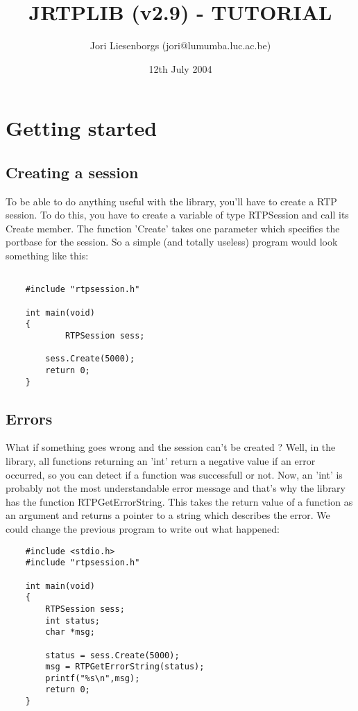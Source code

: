 


\author{Jori Liesenborgs (jori@lumumba.luc.ac.be)}
\title{JRTPLIB (v2.9) - TUTORIAL}
\date{12th July 2004}
\maketitle

\section{Getting started}

\subsection{Creating a session}

To be able to do anything useful with the library, you'll have to create a RTP
session. To do this, you have to create a variable of type RTPSession and call
its Create member. The function 'Create' takes one parameter which specifies
the portbase for the session. So a simple (and totally useless) program would
look something like this:
    \begin{verbatim}

    #include "rtpsession.h"
        
    int main(void)
    {
            RTPSession sess;
        
        sess.Create(5000);
        return 0;
    }
    \end{verbatim}

\subsection{Errors}

What if something goes wrong and the session can't be created ? Well, in the
library, all functions returning an 'int' return a negative value if an error
occurred, so you can detect if a function was successfull or not. Now, an
'int' is probably not the most understandable error message and that's why the
library has the function RTPGetErrorString. This takes the return value of a
function as an argument and returns a pointer to a string which describes the
error. We could change the previous program to write out what happened:
    \begin{verbatim}
    #include <stdio.h>
    #include "rtpsession.h"
        
    int main(void)
    {
        RTPSession sess;
        int status;
        char *msg;
            
        status = sess.Create(5000);
        msg = RTPGetErrorString(status);
        printf("%s\n",msg);
        return 0;
    }
    \end{verbatim}


